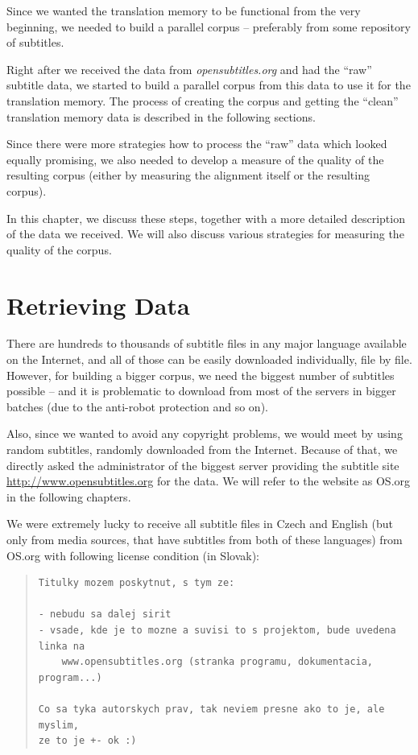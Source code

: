 \label{chap:building_corpus}

Since we wanted the translation memory to be functional from the very beginning, we needed to build a parallel corpus -- preferably from some repository of subtitles.

Right after we received the data from \emph{opensubtitles.org} and had the ``raw'' subtitle data, we started to build a parallel corpus from this data to use it for the translation memory. The process of creating the corpus and getting the ``clean'' translation memory data is described in the following sections.

Since there were more strategies how to process the ``raw'' data which looked equally promising, we also needed to develop a measure of the quality of the resulting corpus (either by measuring the alignment itself or the resulting corpus).

In this chapter, we discuss these steps, together with a more detailed description of the data we received. We will also discuss various strategies for measuring the quality of the corpus.

\section{Retrieving Data}

There are hundreds to thousands of subtitle files in any major language available on the Internet, and all of those can be easily downloaded individually, file by file. However, for building a bigger corpus, we need the biggest number of subtitles possible -- and it is problematic to download from most of the servers in bigger batches (due to the anti-robot protection and so on).

Also, since we wanted to avoid any copyright problems, we would meet by using random subtitles, randomly downloaded from the Internet. Because of that, we directly asked the administrator of the biggest server providing the subtitle site \url{http://www.opensubtitles.org} for the data. We will refer to the website as OS.org in the following chapters.

We were extremely lucky to receive all subtitle files in Czech and English (but only from media sources, that have subtitles from both of these languages) from OS.org with following license condition (in Slovak):

\begin{quote}
\begin{verbatim}
Titulky mozem poskytnut, s tym ze:

- nebudu sa dalej sirit
- vsade, kde je to mozne a suvisi to s projektom, bude uvedena linka na
    www.opensubtitles.org (stranka programu, dokumentacia, program...)

Co sa tyka autorskych prav, tak neviem presne ako to je, ale myslim,
ze to je +- ok :)
\end{verbatim}
\end{quote}

